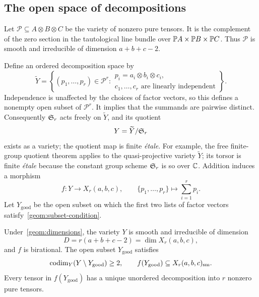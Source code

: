 \subsection{The open space of decompositions}
\label{geom:source}

Let $\mathcal P\subseteq A\otimes B\otimes C$ be the variety
of nonzero pure tensors. It is the complement of the zero section
in the tautological line bundle over
$\mathbb P A\times\mathbb P B\times\mathbb P C$. Thus $\mathcal P$ is smooth
and irreducible of dimension $a+b+c-2$.

Define an ordered decomposition space by
\begin{equation}\label{geom:ordered-source}
 \widetilde Y=
 \left\{(p_1,\ldots,p_r)\in\mathcal P^r:
  \begin{array}{l}
    p_i=a_i\otimes b_i\otimes c_i,\\[-2pt]
    c_1,\ldots,c_r\text{ are linearly independent}
  \end{array}\right\}.
\end{equation}
Independence is unaffected by the choices of factor vectors, so
this defines a nonempty open subset of $\mathcal P^r$.
It implies that the summands are pairwise distinct. Consequently
$\mathfrak S_r$ acts freely on $\widetilde Y$, and its quotient
\begin{equation}\label{geom:unordered-source}
 Y=\widetilde Y/\mathfrak S_r
\end{equation}
exists as a variety; the quotient map is finite \emph{\'etale}.
For example, the free finite-group quotient theorem
\cite[Tag~07S7]{stacks-project} applies to the quasi-projective
variety $\widetilde Y$; its torsor is finite \emph{\'etale}
because the constant group scheme $\mathfrak S_r$ is so over $\mathbb C$.
Addition induces a morphism
\begin{equation}\label{geom:addition-map}
 f:Y\longrightarrow X_r(a,b,c),\qquad
 \{p_1,\ldots,p_r\}\longmapsto\sum_{i=1}^r p_i.
\end{equation}
Let $Y_{\mathrm{good}}$ be the open subset on which the first
two lists of factor vectors satisfy~\eqref{geom:subset-condition}.

\begin{proposition}\label{prop:geometry-summary}
Under~\eqref{geom:dimensions}, the variety $Y$ is smooth and
irreducible of dimension
\[
 D=r(a+b+c-2)=\dim X_r(a,b,c),
\]
and $f$ is birational. The open subset $Y_{\mathrm{good}}$ satisfies
\begin{equation}\label{geom:good-source-properties}
 \operatorname{codim}_Y(Y\setminus Y_{\mathrm{good}})\geq2,
 \qquad
 f(Y_{\mathrm{good}})\subseteq X_r(a,b,c)_{\mathrm{sm}}.
\end{equation}
Every tensor in $f(Y_{\mathrm{good}})$ has a unique unordered
decomposition into $r$ nonzero pure tensors.
\end{proposition}

